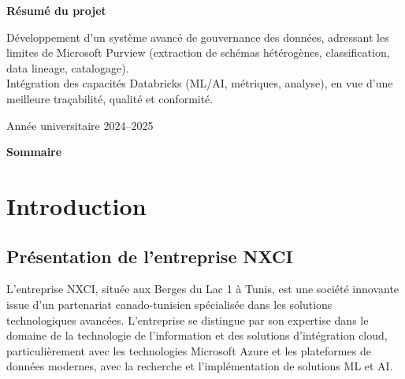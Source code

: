 \documentclass[12pt,a4paper]{article}
\begin{document}
\begin{titlepage}
  \vspace{0.9cm}
  \begin{tcolorbox}[colback=white,colframe=secondarygreen,boxrule=0.8pt,arc=1mm,enhanced,width=0.9\textwidth]
    \centering
    \begin{minipage}{0.92\textwidth}
      \begin{center}
        \textbf{Résumé du projet}\\[2pt]
      \end{center}
      \small
      Développement d’un système avancé de gouvernance des données, adressant les limites de Microsoft Purview
      (extraction de schémas hétérogènes, classification, data lineage, catalogage).\\[4pt]
      Intégration des capacités Databricks (ML/AI, métriques, analyse), en vue d’une meilleure traçabilité,
      qualité et conformité.
    \end{minipage}
  \end{tcolorbox}

  \vfill
  {\small\color{textgray} Année universitaire 2024–2025}
\end{titlepage}

\begin{tcolorbox}[colback=white,colframe=primaryblue,boxrule=0.8pt,arc=1mm,enhanced,width=\textwidth]
  \vspace{-0.3em}
  {\large\bfseries\color{primaryblue} Sommaire}\par\vspace{0.4em}
  \tableofcontents
  \vspace{-0.6em}
\end{tcolorbox}
\newpage

\section{Introduction}

\subsection{Présentation de l'entreprise NXCI}
L'entreprise NXCI, située aux Berges du Lac 1 à Tunis, est une société innovante issue d'un partenariat canado-tunisien spécialisée dans les solutions technologiques avancées. L'entreprise se distingue par son expertise dans le domaine de la technologie de l'information et des solutions d'intégration cloud, particulièrement avec les technologies Microsoft Azure et les plateformes de données modernes, avec la recherche et l'implémentation de solutions ML et AI.
\end{document}
